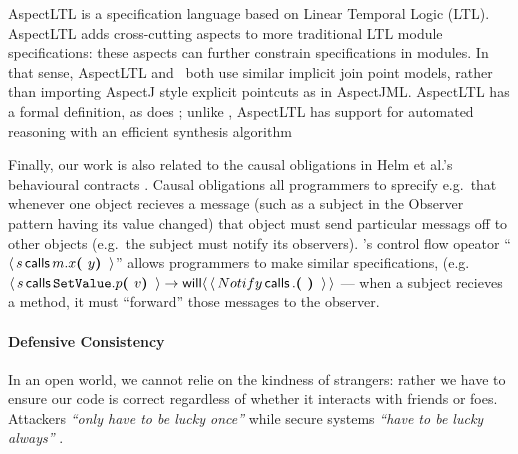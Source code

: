 AspectLTL \cite{AspectLTL} is a specification language based on Linear
Temporal Logic (LTL). AspectLTL adds cross-cutting aspects to more
traditional LTL module specifications: these aspects can further
constrain specifications in modules. In that sense, AspectLTL and
\Chainmail\ both use similar implicit join point models, rather than
importing AspectJ style explicit pointcuts as in AspectJML.  AspectLTL
has a formal definition, as does \Chainmail; unlike \Chainmail,
AspectLTL has support for automated reasoning with an efficient
synthesis algorithm



Finally, our work is also related to the causal obligations in Helm et
al.'s behavioural contracts \cite{helm90}. Causal obligations all
programmers to sprecify e.g.\ that whenever one object recieves a
message (such as a subject in the Observer pattern having its value
changed) that object must send particular messags off to other objects
(e.g.\ the subject must notify its observers). \Chainmail's control
flow opeator ``$\Calls{s}{x}{m}{y}$'' allows programmers to make similar
specifications, (e.g. $\Calls{s}{p}{\prg{SetValue}}{v} \rightarrow \Future{\Calls{Notify}{}{}{}}$ --- when a subject recieves a  method,
  it must ``forward'' those messages to the observer.

\paragraph{Defensive Consistency}


In an open world, we cannot relie on the kindness of strangers: rather
we have to ensure our code is correct regardless of whether it
interacts with friends or foes.
Attackers 
\textit{``only have to be lucky once''} while secure systems 
\textit{``have to be lucky always''} \cite{IRAThatcher}.

